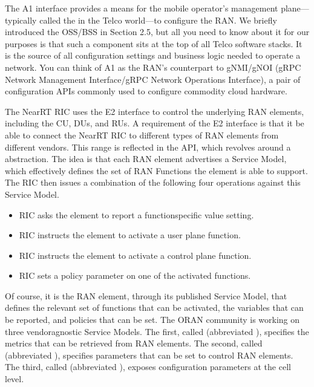 \documentclass[a4paper,11pt,english]{sphinxmanual}
\begin{document}
\sphinxAtStartPar
The A1 interface provides a means for the mobile operator’s management
plane—typically called the  in the Telco world—to configure the RAN. We
briefly introduced the OSS/BSS in Section 2.5, but all you need to
know about it for our purposes is that such a component sits at the
top of all Telco software stacks. It is the source of all
configuration settings and business logic needed to operate a
network. You can think of A1 as the RAN’s counterpart to gNMI/gNOI
(gRPC Network Management Interface/gRPC Network Operations Interface),
a pair of configuration APIs commonly used to configure commodity
cloud hardware.

\sphinxAtStartPar
The Near\sphinxhyphen{}RT RIC uses the E2 interface to control the underlying RAN
elements, including the CU, DUs, and RUs. A requirement of the E2
interface is that it be able to connect the Near\sphinxhyphen{}RT RIC to different
types of RAN elements from different vendors. This range is reflected
in the API, which revolves around a  abstraction. The
idea is that each RAN element advertises a Service Model, which
effectively defines the set of RAN Functions the element is able to
support. The RIC then issues a combination of the following four
operations against this Service Model.
\begin{itemize}
\item {} 
\sphinxAtStartPar
{} RIC asks the element to report a function\sphinxhyphen{}specific value setting.

\item {} 
\sphinxAtStartPar
{} RIC instructs the element to activate a user plane function.

\item {} 
\sphinxAtStartPar
{} RIC instructs the element to activate a control plane function.

\item {} 
\sphinxAtStartPar
{} RIC sets a policy parameter on one of the activated functions.

\end{itemize}

\sphinxAtStartPar
Of course, it is the RAN element, through its published Service Model,
that defines the relevant set of functions that can be activated, the
variables that can be reported, and policies that can be set. The
O\sphinxhyphen{}RAN community is working on three vendor\sphinxhyphen{}agnostic Service
Models. The first, called  (abbreviated
), specifies the metrics that can be retrieved from RAN
elements. The second, called  (abbreviated ),
specifies parameters that can be set to control RAN elements. The
third, called  (abbreviated
), exposes configuration parameters at the cell level.
\end{document}
